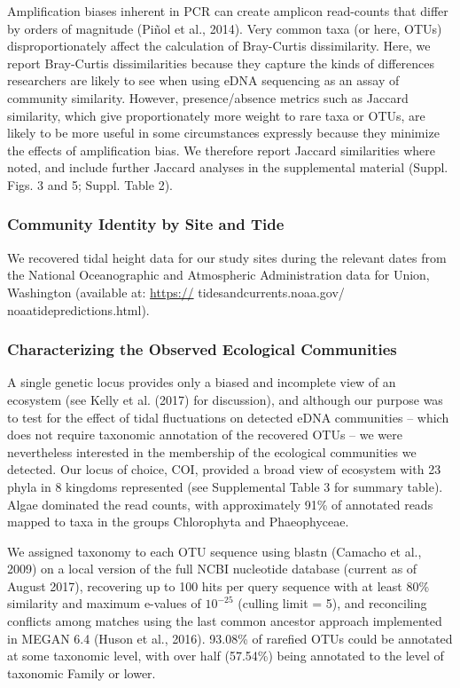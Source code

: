 \documentclass[fleqn,10pt,lineno]{wlpeerj} %
\begin{document}
Amplification biases inherent in PCR can create amplicon read-counts
that differ by orders of magnitude (Piñol et al., 2014). Very common
taxa (or here, OTUs) disproportionately affect the calculation of
Bray-Curtis dissimilarity. Here, we report Bray-Curtis dissimilarities
because they capture the kinds of differences researchers are likely to
see when using eDNA sequencing as an assay of community similarity.
However, presence/absence metrics such as Jaccard similarity, which give
proportionately more weight to rare taxa or OTUs, are likely to be more
useful in some circumstances expressly because they minimize the effects
of amplification bias. We therefore report Jaccard similarities where
noted, and include further Jaccard analyses in the supplemental material
(Suppl. Figs. 3 and 5; Suppl. Table 2).

\subsubsection{Community Identity by Site and
Tide}\label{community-identity-by-site-and-tide}

We recovered tidal height data for our study sites during the relevant
dates from the National Oceanographic and Atmospheric Administration
data for Union, Washington (available at: \url{https://}
tidesandcurrents.noaa.gov/ noaatidepredictions.html).

\subsubsection{Characterizing the Observed Ecological
Communities}\label{characterizing-the-observed-ecological-communities}

A single genetic locus provides only a biased and incomplete view of an
ecosystem (see Kelly et al. (2017) for discussion), and although our
purpose was to test for the effect of tidal fluctuations on detected
eDNA communities -- which does not require taxonomic annotation of the
recovered OTUs -- we were nevertheless interested in the membership of
the ecological communities we detected. Our locus of choice, COI,
provided a broad view of ecosystem with 23 phyla in 8 kingdoms
represented (see Supplemental Table 3 for summary table). Algae
dominated the read counts, with approximately 91\% of annotated reads
mapped to taxa in the groups Chlorophyta and Phaeophyceae.

We assigned taxonomy to each OTU sequence using blastn (Camacho et al.,
2009) on a local version of the full NCBI nucleotide database (current
as of August 2017), recovering up to 100 hits per query sequence with at
least 80\% similarity and maximum e-values of \(10^{-25}\) (culling
limit = 5), and reconciling conflicts among matches using the last
common ancestor approach implemented in MEGAN 6.4 (Huson et al., 2016).
93.08\% of rarefied OTUs could be annotated at some taxonomic level,
with over half (57.54\%) being annotated to the level of taxonomic
Family or lower.
\end{document}

